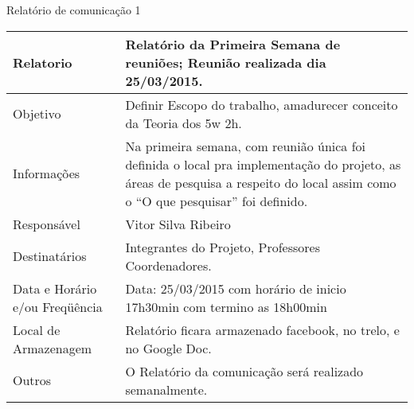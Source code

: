 % 
% 
%  
% 
% 
\begin{center}
{\large Relatório de comunicação 1}
\begin{table}[h]
\begin{tabular}{|p{6cm}|p{9cm}|}\hline
Relatorio & Relatório da Primeira Semana de reuniões; Reunião realizada dia 25/03/2015.\\ \hline
Objetivo & Definir Escopo do trabalho, amadurecer conceito da Teoria dos 5w 2h.\\ \hline
Informações & Na primeira semana, com reunião única foi definida o local pra implementação do projeto, as áreas de pesquisa a respeito do local assim como o “O que pesquisar” foi definido.\\ \hline
Responsável & Vitor Silva Ribeiro\\ \hline
Destinatários & Integrantes do Projeto, Professores Coordenadores.\\ \hline
Data e Horário e/ou Freqüência & Data: 25/03/2015 com horário de inicio 17h30min com termino as 18h00min\\ \hline
Local de Armazenagem & Relatório ficara armazenado facebook, no trelo, e no Google Doc.\\ \hline
Outros & O Relatório da comunicação será realizado semanalmente.\\ \hline

\end{tabular}
\end{table}


\end{center}
